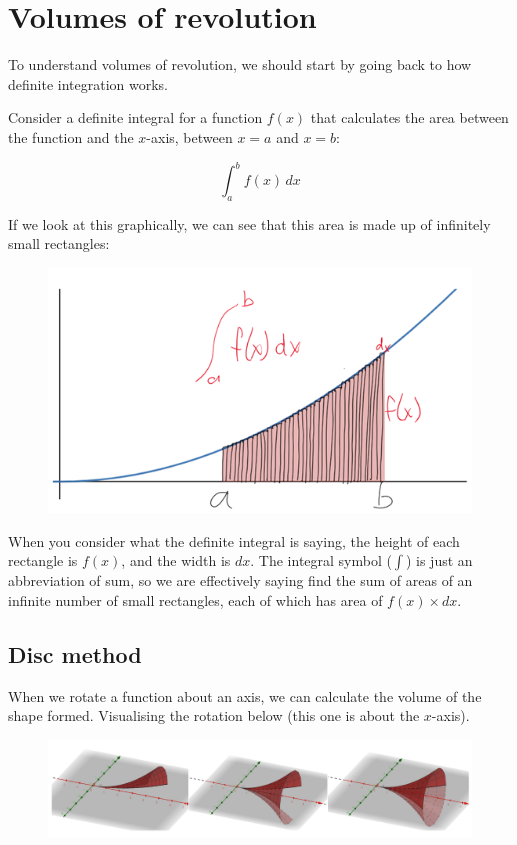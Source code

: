 \documentclass[../main.tex]{subfiles}
\begin{document}
\section{Volumes of revolution}
To understand volumes of revolution, we should start by going back to how definite integration works.

Consider a definite integral for a function $f(x)$ that calculates the area between the function and the $x$-axis, between $x=a$ and $x=b$:

\[\int_a^b f(x)\, dx\]

If we look at this graphically, we can see that this area is made up of infinitely small rectangles:

\begin{figure}[h]
    \centering
    \includegraphics[width=0.5\linewidth]{images/volrev1.png}
\end{figure}

When you consider what the definite integral is saying, the height of each rectangle is $f(x)$, and the width is $dx$. The integral symbol ($\int$) is just an abbreviation of sum, so we are effectively saying find the sum of areas of an infinite number of small rectangles, each of which has area of $f(x)\times dx$.

\subsection*{Disc method}
When we rotate a function about an axis, we can calculate the volume of the shape formed. Visualising the rotation below (this one is about the $x$-axis).

\begin{figure}[h]
    \centering
    \includegraphics[width=0.75\linewidth]{images/volrev2.png}
\end{figure}
\end{document}
